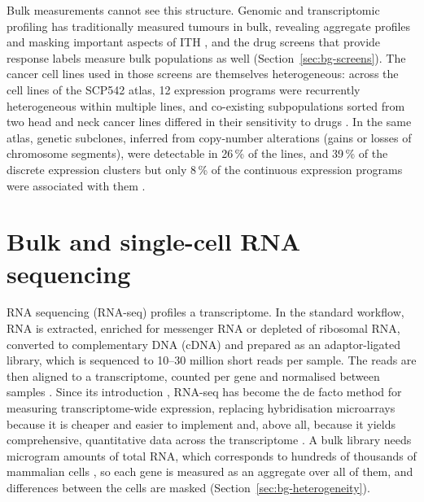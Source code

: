 Bulk measurements cannot see this structure. Genomic and transcriptomic profiling has traditionally
measured tumours in bulk, revealing aggregate profiles and masking important aspects of ITH
\cite{castro2021}, and the drug screens that provide response labels measure bulk populations as well
(Section~\ref{sec:bg-screens}). The cancer cell lines used in those screens are themselves heterogeneous:
across the cell lines of the SCP542 atlas, 12 expression programs were recurrently heterogeneous within
multiple lines, and co-existing subpopulations sorted from two head and neck cancer lines differed in
their sensitivity to drugs \cite{scp542}. In the same atlas, genetic subclones, inferred from
copy-number alterations (gains or losses of chromosome segments), were detectable in 26\,\% of the
\NLinesAtlas{} lines, and 39\,\% of the discrete expression clusters but only 8\,\% of the continuous
expression programs were associated with them \cite{scp542}.

\section{Bulk and single-cell RNA sequencing}
\label{sec:bg-rnaseq}

RNA sequencing (RNA-seq) profiles a transcriptome. In the standard workflow, RNA is extracted, enriched
for messenger RNA or depleted of ribosomal RNA, converted to complementary DNA (cDNA) and prepared as an
adaptor-ligated library, which is sequenced to 10--30 million short reads per sample. The reads are then
aligned to a transcriptome, counted per gene and normalised between samples \cite{stark2019}. Since its
introduction \cite{wang2009}, RNA-seq has become the de facto method for measuring transcriptome-wide
expression, replacing hybridisation microarrays because it is cheaper and easier to implement and, above
all, because it yields comprehensive, quantitative data across the transcriptome \cite{stark2019}. A bulk
library needs microgram amounts of total RNA, which corresponds to hundreds of thousands of mammalian
cells \cite{tang2009}, so each gene is measured as an aggregate over all of them, and differences between
the cells are masked (Section~\ref{sec:bg-heterogeneity}).

